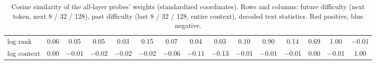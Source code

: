 \begin{table}[H]
\begin{tabular}{lcccccccccccccc}
    log rank & \cellcolor{red!4}0.06 & \cellcolor{red!3}0.05 & \cellcolor{red!3}0.05 & \cellcolor{red!2}0.03 & \cellcolor{red!9}0.15 & \cellcolor{red!4}0.07 & \cellcolor{red!3}0.04 & \cellcolor{red!2}0.03 & \cellcolor{red!6}0.10 & \cellcolor{red!54}0.90 & \cellcolor{red!8}0.14 & \cellcolor{red!41}0.69 & \cellcolor{red!60}1.00 & \cellcolor{blue!1}$-$0.01 \\
    log context & \cellcolor{blue!0}0.00 & \cellcolor{blue!1}$-$0.01 & \cellcolor{blue!1}$-$0.02 & \cellcolor{blue!1}$-$0.02 & \cellcolor{blue!1}$-$0.02 & \cellcolor{blue!4}$-$0.06 & \cellcolor{blue!7}$-$0.11 & \cellcolor{blue!8}$-$0.13 & \cellcolor{blue!1}$-$0.01 & \cellcolor{blue!1}$-$0.01 & \cellcolor{blue!1}$-$0.01 & \cellcolor{blue!0}0.00 & \cellcolor{blue!1}$-$0.01 & \cellcolor{red!60}1.00 \\
  \end{tabular}
  \caption{Cosine similarity of the all-layer probes' weights (standardized coordinates). Rows and columns: future difficulty (next token, next 8 / 32 / 128), past difficulty (last 8 / 32 / 128, entire context), decoded text statistics. Red positive, blue negative.}
  \label{tab:probe-cosine}
\end{table}

